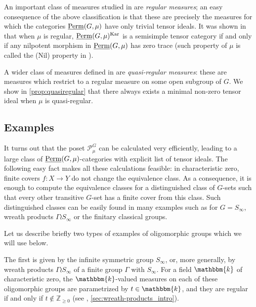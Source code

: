 \documentclass[11pt,a4paper]{amsart}
\theoremstyle{plain}%
\theoremstyle{definition}
\theoremstyle{remark}
\newcommand{\Z}{{\mathbb Z}}
\newcommand{\Perm}{\underline{{\rm Perm}}}
\newcommand{\kk}{\mathbbm{k}}
\newcommand{\Kar}{\mathrm{Kar}}
\begin{document}
An important class of measures studied in \cite{HS-oligomorphic} are \emph{regular measures}; an easy consequence of the above classification is that these are precisely the measures for which the categories $\Perm(G, \mu)$ have only trivial tensor ideals. It was shown in \cite{HS-oligomorphic, HS-classical} that when $\mu$ is regular, $\Perm(G, \mu)^{\Kar}$ is a semisimple tensor category if and only if any nilpotent morphism in $\Perm(G, \mu)$ has zero trace (such property of $\mu$ is called the (Nil) property in \cite{HS-classical}).

A wider class of measures defined in \cite{HS-oligomorphic} are \emph{quasi-regular measures}: these are measures which restrict to a regular measure on some open subgroup of $G$. We show in \cref{prop:quasiregular} that there always exists a minimal non-zero tensor ideal when $\mu$ is quasi-regular.

\subsection{Examples}

It turns out that the poset $\mathcal{P}_{\mu}^G$ can be calculated very efficiently, leading to a large class of $\Perm(G,\mu)$-categories with explicit list of tensor ideals.
The following easy fact makes all these calculations feasible: in characteristic zero, finite covers $f:X\to Y$ do not change the equivalence class. As a consequence, it is enough to compute the equivalence classes for a distinguished class of $G$-sets such that every other transitive $G$-set has a finite cover from this class. Such distinguished classes can be easily found in many examples such as for $G = S_{\infty}$, wreath products $\Gamma \wr S_{\infty}$ or the finitary classical groups.

Let {us} describe briefly two types of examples of oligomorphic groups which we will use below. 

The first is given {by} the infinite symmetric group $S_{\infty}$, or, more generally, by wreath products $\Gamma \wr S_{\infty}$ of a finite group $\Gamma$ with $S_{\infty}$. For a field $\kk$ of characteristic zero, the $\kk$-valued measures on each of these oligomorphic groups are parametrized by $t\in \kk$, and they are regular if and only if $t\notin \Z_{\geq 0}$ (see \cite{HS-oligomorphic}, \cref{sec:wreath-products_intro}).
\end{document}
